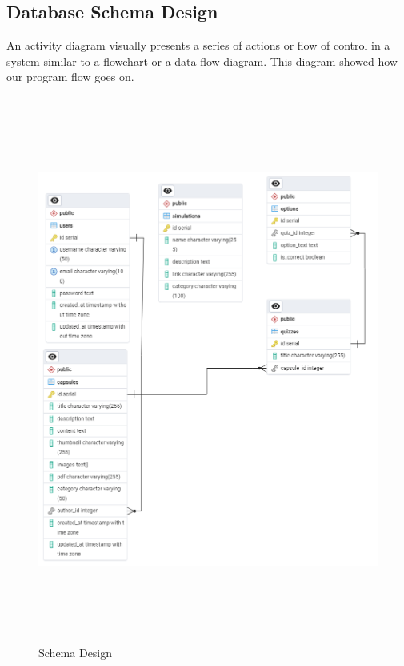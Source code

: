 \subsection{Database Schema Design}
An activity diagram visually presents a series of actions or flow of control in a system similar to a flowchart or a data flow diagram. This diagram showed how our program flow goes on.
\begin{figure}[H]
   \centering
    \includegraphics[height = 18cm]{Diagrams/Schema Design.png}
    \caption{Schema Design}
\end{figure}
\newpage

